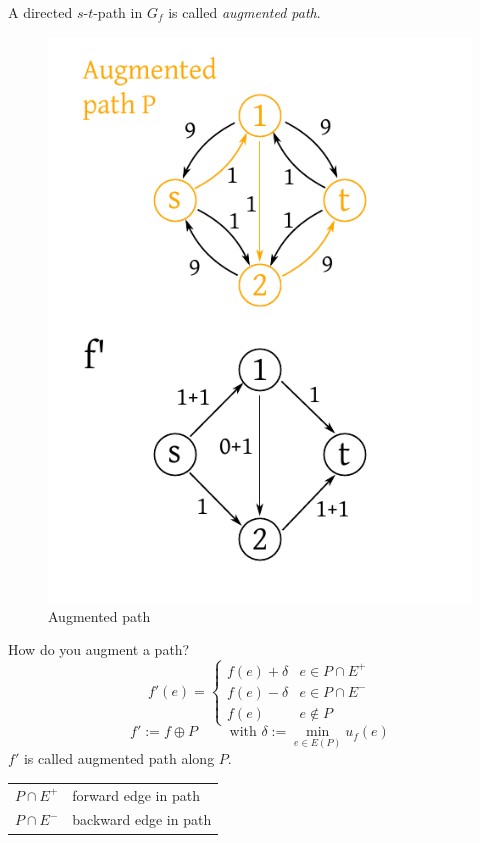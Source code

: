 \documentclass[a4paper]{article}
\theoremstyle{definition}
\newcommand{\gath}[2]{$#1$-$#2$-path} %
\begin{document}
A directed \gath st in $G_f$ is called \emph{augmented path}.

\begin{figure}[ht]
 \begin{center}
  \includegraphics{img/augmented_path.pdf}
  \caption{Augmented path}
 \end{center}
\end{figure}

How do you augment a path?
\[
  f'(e) = \left\{\begin{array}{lc}
    f(e) + \delta  & e \in P \cap E^+ \\
    f(e) - \delta  & e \in P \cap E^- \\
    f(e)           & e \notin P
  \end{array}\right.
\] \[
  f' := f \oplus P \qquad \text{ with } \delta := \min_{e \in E(P)} {u_f(e)}
\]
$f'$ is called augmented path along $P$.

\begin{center}
 \begin{tabular}{cl}
  $P \cap E^+$ & forward edge in path \\
  $P \cap E^-$ & backward edge in path
 \end{tabular}
\end{center}
\end{document}
